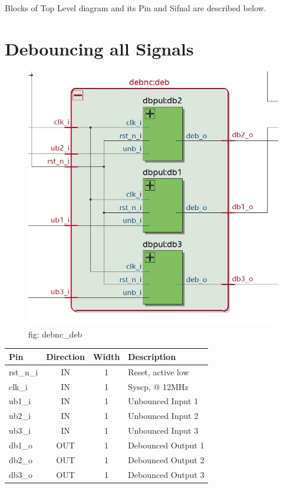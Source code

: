 \documentclass[12pt,a4 paper] {report}
\begin{document}
\newpage

Blocks of Top Level diagram and its Pin and Sifnal are described below. 

\section{Debouncing all Signals}	
\begin{figure}[h]
	\centering	
	\includegraphics[scale=0.3]{../png/debnc_deb.png}
	\newline
	fig: debnc\_deb \\
\end{figure}

\begin{center}
	\begin{tabular}{ | p{2cm} | c | c | p{5cm} |}
		\hline
		\textbf{Pin} & \textbf{Direction} & \textbf{Width} & \textbf{Description} \\
		\hline
	  rst\_n\_i & IN & 1 & Reset, active low\\
	  \hline
		clk\_i & IN & 1 & Syscp, @ 12MHz \\
		\hline
		ub1\_i & IN & 1 & Unbounced Input 1 \\
		\hline
		ub2\_i & IN & 1 & Unbounced Input 2 \\
		\hline
		ub3\_i & IN & 1 & Unbounced Input 3 \\
		\hline
		db1\_o & OUT & 1 & Debounced Output 1 \\
		\hline
		db2\_o & OUT & 1 & Debounced Output 2 \\
		\hline
		db3\_o & OUT & 1 & Debounced Output 3 \\
		\hline
	\end{tabular}
\end{center}
\end{document}
